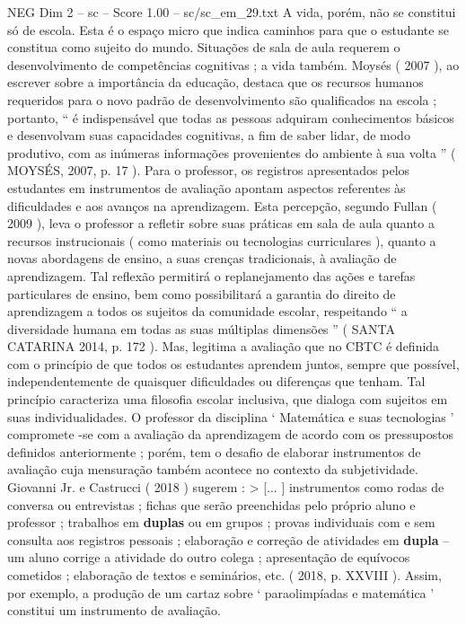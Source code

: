 \begin{textsample}{NEG Dim 2 – sc – Score 1.00 – sc/sc\_em\_29.txt}
A vida, porém, não se constitui só de escola.
Esta é o espaço micro que indica caminhos para que o estudante se constitua como sujeito do mundo.
Situações de sala de aula requerem o desenvolvimento de competências cognitivas ; a vida também.
Moysés ( 2007 ), ao escrever sobre a importância da educação, destaca que os recursos humanos requeridos para o novo padrão de desenvolvimento são qualificados na escola ; portanto, “ é indispensável que todas as pessoas adquiram conhecimentos básicos e desenvolvam suas capacidades cognitivas, a fim de saber lidar, de modo produtivo, com as inúmeras informações provenientes do ambiente à sua volta ” ( MOYSÉS, 2007, p. 17 ).
Para o professor, os registros apresentados pelos estudantes em instrumentos de avaliação apontam aspectos referentes às dificuldades e aos avanços na aprendizagem.
Esta percepção, segundo Fullan ( 2009 ), leva o professor a refletir sobre suas práticas em sala de aula quanto a recursos instrucionais ( como materiais ou tecnologias curriculares ), quanto a novas abordagens de ensino, a suas crenças tradicionais, à avaliação de aprendizagem.
Tal reflexão permitirá o replanejamento das ações e tarefas particulares de ensino, bem como possibilitará a garantia do direito de aprendizagem a todos os sujeitos da comunidade escolar, respeitando “ a diversidade humana em todas as suas múltiplas dimensões ” ( SANTA CATARINA 2014, p. 172 ).
Mas, legitima a avaliação que no CBTC é definida com o princípio de que todos os estudantes aprendem juntos, sempre que possível, independentemente de quaisquer dificuldades ou diferenças que tenham.
Tal princípio caracteriza uma filosofia escolar inclusiva, que dialoga com sujeitos em suas individualidades.
O professor da disciplina ‘ Matemática e suas tecnologias ’ compromete -se com a avaliação da aprendizagem de acordo com os pressupostos definidos anteriormente ; porém, tem o desafio de elaborar instrumentos de avaliação cuja mensuração também acontece no contexto da subjetividade.
Giovanni Jr. e Castrucci ( 2018 ) sugerem : > [... ] instrumentos como rodas de conversa ou entrevistas ; fichas que serão preenchidas pelo próprio aluno e professor ; trabalhos em \textbf{duplas} ou em grupos ; provas individuais com e sem consulta aos registros pessoais ; elaboração e correção de atividades em \textbf{dupla} – um aluno corrige a atividade do outro colega ; apresentação de equívocos cometidos ; elaboração de textos e seminários, etc. ( 2018, p.
XXVIII ).
Assim, por exemplo, a produção de um cartaz sobre ‘ paraolimpíadas e matemática ’ constitui um instrumento de avaliação.

\end{textsample}
